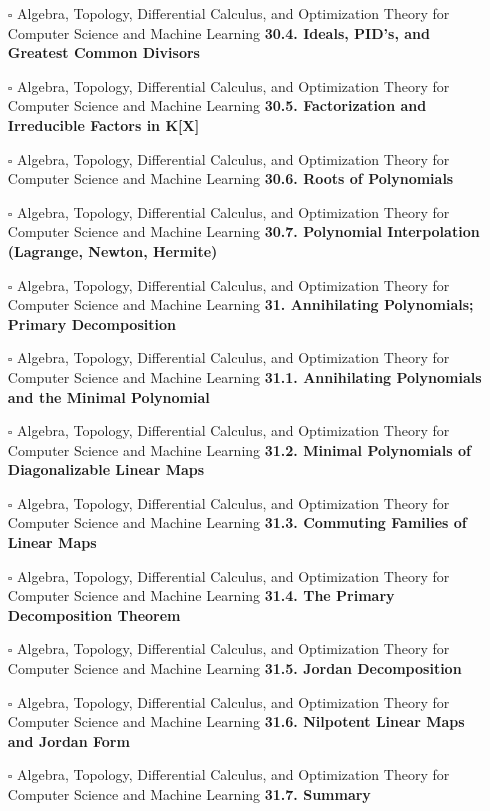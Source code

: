 \documentclass[a4, landscape, 12pt]{article}
\newcommand{\checkbox}{$\square$}%
\begin{document}
\begin{itemize}
{}
\item [\checkbox]  Algebra, Topology, Differential Calculus, and Optimization Theory for Computer Science and Machine Learning \textbf{ 30.4. Ideals, PID’s, and Greatest Common Divisors
}
\item [\checkbox]  Algebra, Topology, Differential Calculus, and Optimization Theory for Computer Science and Machine Learning \textbf{ 30.5. Factorization and Irreducible Factors in K[X]
}
\item [\checkbox]  Algebra, Topology, Differential Calculus, and Optimization Theory for Computer Science and Machine Learning \textbf{ 30.6. Roots of Polynomials
}
\item [\checkbox]  Algebra, Topology, Differential Calculus, and Optimization Theory for Computer Science and Machine Learning \textbf{ 30.7. Polynomial Interpolation (Lagrange, Newton, Hermite)
}
\item [\checkbox]  Algebra, Topology, Differential Calculus, and Optimization Theory for Computer Science and Machine Learning \textbf{ 31. Annihilating Polynomials; Primary Decomposition
}
\item [\checkbox]  Algebra, Topology, Differential Calculus, and Optimization Theory for Computer Science and Machine Learning \textbf{ 31.1. Annihilating Polynomials and the Minimal Polynomial
}
\item [\checkbox]  Algebra, Topology, Differential Calculus, and Optimization Theory for Computer Science and Machine Learning \textbf{ 31.2. Minimal Polynomials of Diagonalizable Linear Maps
}
\item [\checkbox]  Algebra, Topology, Differential Calculus, and Optimization Theory for Computer Science and Machine Learning \textbf{ 31.3. Commuting Families of Linear Maps
}
\item [\checkbox]  Algebra, Topology, Differential Calculus, and Optimization Theory for Computer Science and Machine Learning \textbf{ 31.4. The Primary Decomposition Theorem
}
\item [\checkbox]  Algebra, Topology, Differential Calculus, and Optimization Theory for Computer Science and Machine Learning \textbf{ 31.5. Jordan Decomposition
}
\item [\checkbox]  Algebra, Topology, Differential Calculus, and Optimization Theory for Computer Science and Machine Learning \textbf{ 31.6. Nilpotent Linear Maps and Jordan Form
}
\item [\checkbox]  Algebra, Topology, Differential Calculus, and Optimization Theory for Computer Science and Machine Learning \textbf{ 31.7. Summary
}
\end{itemize}
\end{document}

